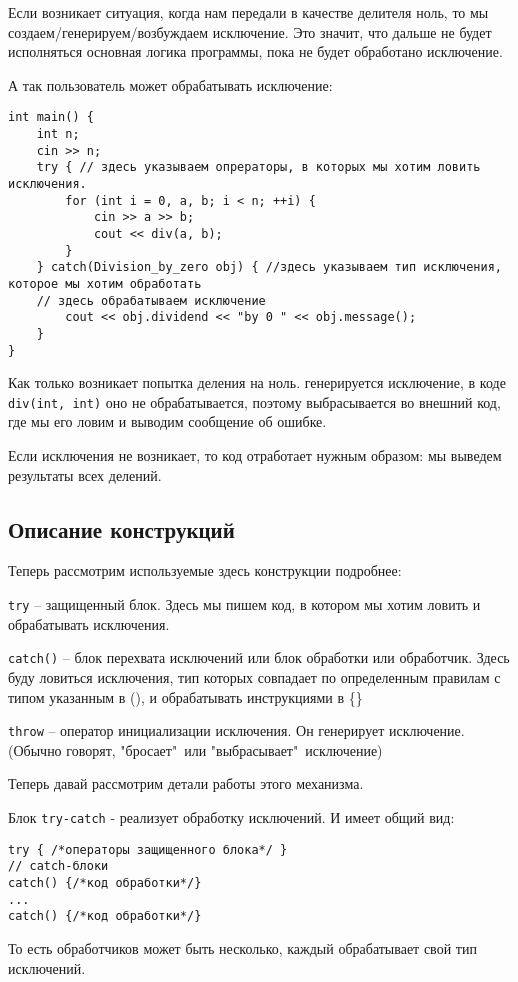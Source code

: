 Если возникает ситуация, когда нам передали в качестве делителя ноль, то мы создаем/генерируем/возбуждаем исключение. Это значит, что дальше не будет исполняться основная логика программы, пока не будет обработано исключение.

А так пользователь может обрабатывать исключение:
\begin{verbatim}
int main() {
    int n;
    cin >> n;
    try { // здесь указываем опрераторы, в которых мы хотим ловить исключения.
        for (int i = 0, a, b; i < n; ++i) {
            cin >> a >> b;
            cout << div(a, b);
        }
    } catch(Division_by_zero obj) { //здесь указываем тип исключения, которое мы хотим обработать
    // здесь обрабатываем исключение
        cout << obj.dividend << "by 0 " << obj.message();
    }
}
\end{verbatim}

Как только возникает попытка деления на ноль. генерируется исключение, в коде \texttt{div(int, int)} оно не обрабатывается, поэтому выбрасывается во внешний код, где мы его ловим и выводим сообщение об ошибке.

Если исключения не возникает, то код отработает нужным образом: мы выведем результаты всех делений.

\subsection{Описание конструкций}
Теперь рассмотрим используемые здесь конструкции подробнее:

\texttt{try{}} -- защищенный блок. Здесь мы пишем код, в котором мы хотим ловить и обрабатывать исключения.

\texttt{catch(){}} -- блок перехвата исключений или блок обработки или обработчик. Здесь буду ловиться исключения, тип которых совпадает по определенным правилам с типом указанным в (), и обрабатывать инструкциями в \{\}

\texttt{throw} -- оператор инициализации исключения. Он генерирует исключение. (Обычно говорят, "бросает"\ или "выбрасывает"\ исключение)

Теперь давай рассмотрим детали работы этого механизма.

Блок \texttt{try-catch} - реализует обработку исключений. И имеет общий вид:
\begin{verbatim}
try { /*операторы защищенного блока*/ }
// catch-блоки
catch() {/*код обработки*/}
...
catch() {/*код обработки*/}

\end{verbatim}
То есть обработчиков может быть несколько, каждый обрабатывает свой тип исключений.


